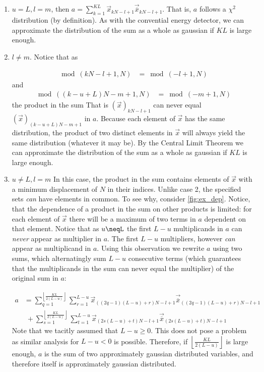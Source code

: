 \documentclass[a4paper, openany, oneside]{memoir}
\begin{document}
\begin{enumerate}
	\item $u=L, l=m$, then $a = \sum_{k=1}^{KL}\vec{x}_{kN-l+1}\vec{\overline{x}}_{kN-l+1}$. That is, $a$ follows a $\chi^2$ distribution (by definition). As with the convential energy detector, we can approximate the distribution of the sum as a whole as gaussian if $KL$ is large enough.
	\item $l \neq m$. Notice that as 

	\begin{align*}
	\bmod(kN-l+1,N) &= \bmod(-l+1, N)
	\end{align*}
	and
	\begin{align*}
	\bmod((k-u+L)N - m+1,N) &= \bmod(-m+1, N)
	\end{align*}
	the product in the sum
	That is $(\vec{x})_{kN-l+1}$  can never equal  $(\vec{x})_{(k-u+L)N - m+1}$ in $a$. Because each element of $\vec{x}$ has the same distribution, the product of two distinct elements in $\vec{x}$ will always yield the same distribution (whatever it may be). By the Central Limit Theorem we can approximate the distribution of the sum as a whole as gaussian if $KL$ is large enough.

	\item $u\neq L, l=m$ In this case, the product in the sum contains elements of $\vec{x}$ with a minimum displacement of $N$ in their indices. Unlike case 2, the specified sets \emph{can} have elements in common. To see why, consider \cref{fig:ex_dep}. Notice, that the dependence of a product in the sum on other products is limited: for each element of $\vec{x}$ there will be a maximum of two terms in $a$ dependent on that element. Notice that as $u\neqL$ the first $L-u$ multiplicands in $a$ can \emph{never} appear as multiplier in $a$. The first $L-u$ multipliers, however \emph{can} appear as multiplicand in $a$.  Using this observation we rewrite $a$ using two sums, which alternatingly sum $L-u$ consecutive terms (which guarantees that the multiplicands in the sum can never equal the multiplier) of the original sum in $a$: 

	\begin{align*}
	a &= \sum_{q=1}^{\left\lfloor{\frac{KL}{2(L-u)}}\right\rfloor} \sum_{r=1}^{L-u} \vec{x}_{((2q-1)(L-u)+r)N-l+1}\vec{\overline{x}}_{((2q-1)(L-u)+r)N-l+1} \\
	   & \;+ \sum_{s=1}^{\left\lfloor{\frac{KL}{2(L-u)}}\right\rfloor} \sum_{t=1}^{L-u} \vec{x}_{(2s(L-u)+t)N-l+1}\vec{\overline{x}}_{(2s(L-u)+t)N-l+1}
	\end{align*}
	Note that we tacitly assumed that $L-u \geq 0$. This does not pose a problem as similar analysis for $L-u < 0$ is possible. 
	Therefore, if $\left\lfloor{\frac{KL}{2(L-u)}}\right\rfloor$ is large enough, $a$ is the sum of two approximately gaussian distributed variables, and therefore itself is approximately gaussian distributed.			
\end{enumerate}
\end{document}
